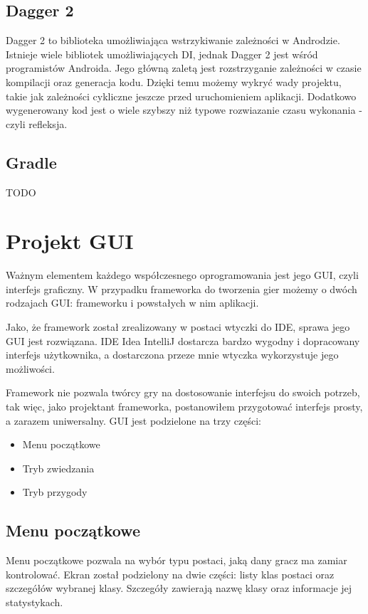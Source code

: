 \documentclass	{xmgr}
\begin{document}
\section{Dagger 2}

Dagger 2 \cite{Dagger2:2017:Doc} to biblioteka umożliwiająca wstrzykiwanie zależności w Androdzie. Istnieje wiele bibliotek umożliwiających DI, jednak Dagger 2 jest wśród programistów Androida. Jego główną zaletą jest rozstrzyganie zależności w czasie kompilacji oraz generacja kodu. Dzięki temu możemy wykryć wady projektu, takie jak zależności cykliczne jeszcze przed uruchomieniem aplikacji. Dodatkowo wygenerowany kod jest o wiele szybszy niż typowe rozwiazanie czasu wykonania - czyli refleksja.

\section{Gradle}
TODO

\chapter{Projekt GUI}
Ważnym elementem każdego współczesnego oprogramowania jest jego GUI, czyli interfejs graficzny. W przypadku frameworka do tworzenia gier  możemy o dwóch rodzajach GUI: frameworku i powstałych w nim aplikacji. 

Jako, że framework został zrealizowany w postaci wtyczki do IDE, sprawa jego GUI jest rozwiązana. IDE Idea IntelliJ dostarcza bardzo wygodny i dopracowany interfejs użytkownika, a dostarczona przeze mnie wtyczka wykorzystuje jego możliwości. 

Framework nie pozwala twórcy gry na dostosowanie interfejsu do swoich potrzeb, tak więc, jako projektant frameworka, postanowiłem przygotować interfejs prosty, a zarazem uniwersalny. GUI jest podzielone na trzy części:
\begin{itemize}
	\item Menu początkowe
	\item Tryb zwiedzania
	\item Tryb przygody
\end{itemize}
\section{Menu początkowe}
Menu początkowe pozwala na wybór typu postaci, jaką dany gracz ma zamiar kontrolować. Ekran został podzielony na dwie części: listy klas postaci oraz szczegółów wybranej klasy. Szczegóły zawierają nazwę klasy oraz informacje jej statystykach.
\end{document}
